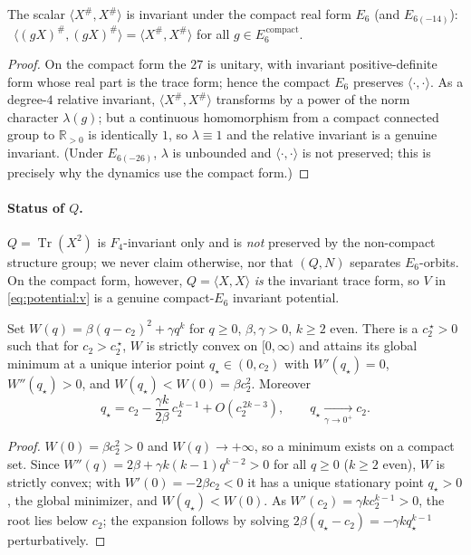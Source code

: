 \begin{theorem}
\label{thm:potential:T2}
The scalar $\langle X^\#,X^\#\rangle$ is invariant under the compact real form $E_6$ (and
$E_{6(-14)}$): \ $\langle(gX)^\#,(gX)^\#\rangle=\langle X^\#,X^\#\rangle$ for all
$g\in E_6^{\,\mathrm{compact}}$.
\end{theorem}

\begin{proof}
On the compact form the $27$ is unitary, with invariant positive-definite form whose real
part is the trace form; hence the compact $E_6$ preserves $\langle\cdot,\cdot\rangle$. As a
degree-$4$ relative invariant, $\langle X^\#,X^\#\rangle$ transforms by a power of the norm
character $\lambda(g)$; but a continuous homomorphism from a compact connected group to
$\mathbb R_{>0}$ is identically $1$, so $\lambda\equiv1$ and the relative invariant is a
genuine invariant. (Under $E_{6(-26)}$, $\lambda$ is unbounded and $\langle\cdot,\cdot\rangle$
is not preserved; this is precisely why the dynamics use the compact form.)
\end{proof}

\paragraph{Status of $Q$.}
$Q=\operatorname{Tr}(X^2)$ is $F_4$-invariant only and is \emph{not} preserved by the
non-compact structure group; we never claim otherwise, nor that $(Q,N)$ separates $E_6$-orbits.
On the compact form, however, $Q=\langle X,X\rangle$ \emph{is} the invariant trace form, so
$V$ in \eqref{eq:potential:v} is a genuine compact-$E_6$ invariant potential.

\begin{lemma}
\label{lem:potential:L2}
Set $W(q)=\beta(q-c_2)^2+\gamma q^k$ for $q\ge0$, $\beta,\gamma>0$, $k\ge2$ even. There is a
$c_2^{\,\star}>0$ such that for $c_2>c_2^{\,\star}$, $W$ is strictly convex on $[0,\infty)$ and
attains its global minimum at a unique interior point $q_\star\in(0,c_2)$ with $W'(q_\star)=0$,
$W''(q_\star)>0$, and $W(q_\star)<W(0)=\beta c_2^2$. Moreover
\begin{equation}
\label{eq:potential:qstar}
q_\star=c_2-\frac{\gamma k}{2\beta}\,c_2^{\,k-1}+O(c_2^{\,2k-3}),
\qquad q_\star\xrightarrow[\gamma\to0^+]{}c_2.
\end{equation}
\end{lemma}

\begin{proof}
$W(0)=\beta c_2^2>0$ and $W(q)\to+\infty$, so a minimum exists on a compact set. Since
$W''(q)=2\beta+\gamma k(k-1)q^{k-2}>0$ for all $q\ge0$ ($k\ge2$ even), $W$ is strictly convex;
with $W'(0)=-2\beta c_2<0$ it has a unique stationary point $q_\star>0$, the global minimizer,
and $W(q_\star)<W(0)$. As $W'(c_2)=\gamma k c_2^{k-1}>0$, the root lies below $c_2$; the
expansion follows by solving $2\beta(q_\star-c_2)=-\gamma k q_\star^{k-1}$ perturbatively.
\end{proof}

